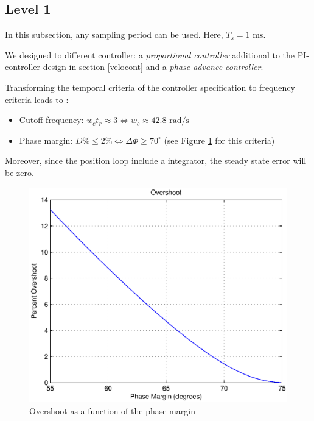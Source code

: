\subsection*{Level 1}

In this subsection, any sampling period can be used. Here, $T_s = 1 \text{ ms}$.

We designed to different controller: a \emph{proportional controller} additional to the PI-controller design in section \ref{velocont} and a \emph{phase advance controller}.

Transforming the temporal criteria of the controller specification to frequency criteria leads to :
\begin{itemize}
 \item Cutoff frequency: $w_c t_r \approx 3 \Leftrightarrow w_c \approx 42.8 \text{ rad/s}$
 \item Phase margin: $D\% \leq 2\% \Leftrightarrow \Delta \Phi \geq 70^{\circ}$ (see Figure \ref{overshootMargin} for this criteria)
\end{itemize}

Moreover, since the position loop include a integrator, the steady state error will be zero.

\begin{center}
\begin{figure}[ht]
 \includegraphics[width=\linewidth]{fig/overshootMargin.eps}
 \caption{Overshoot as a function of the phase margin}
 \label{overshootMargin}
\end{figure}
\end{center}

